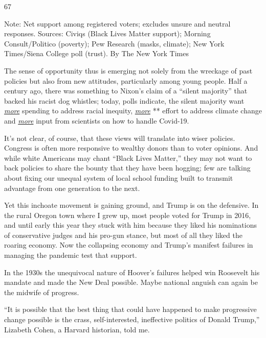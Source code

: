 67

Note: Net support among registered voters; excludes unsure and neutral
responses. Sources: Civiqs (Black Lives Matter support); Morning
Consult/Politico (poverty); Pew Research (masks, climate); New York
Times/Siena College poll (trust). \textbar{} By The New York Times

The sense of opportunity thus is emerging not solely from the wreckage
of past policies but also from new attitudes, particularly among young
people. Half a century ago, there was something to Nixon's claim of a
``silent majority'' that backed his racist dog whistles; today, polls
indicate, the silent majority want
\href{https://gssdataexplorer.norc.org/projects/82650/variables/188/vshow}{\emph{more}}
spending to address racial inequity,
\href{https://www.pewresearch.org/fact-tank/2020/04/21/how-americans-see-climate-change-and-the-environment-in-7-charts/}{\emph{more}}
** effort to address climate change and
\href{https://www.nytimes3xbfgragh.onion/2020/06/27/upshot/coronavirus-americans-trust-experts.html}{\emph{more}}
input from scientists on how to handle Covid-19.

It's not clear, of course, that these views will translate into wiser
policies. Congress is often more responsive to wealthy donors than to
voter opinions. And while white Americans may chant ``Black Lives
Matter,'' they may not want to back policies to share the bounty that
they have been hogging; few are talking about fixing our unequal system
of local school funding built to transmit advantage from one generation
to the next.

Yet this inchoate movement is gaining ground, and Trump is on the
defensive. In the rural Oregon town where I grew up, most people voted
for Trump in 2016, and until early this year they stuck with him because
they liked his nominations of conservative judges and his pro-gun
stance, but most of all they liked the roaring economy. Now the
collapsing economy and Trump's manifest failures in managing the
pandemic test that support.

In the 1930s the unequivocal nature of Hoover's failures helped win
Roosevelt his mandate and made the New Deal possible. Maybe national
anguish can again be the midwife of progress.

``It is possible that the best thing that could have happened to make
progressive change possible is the crass, self-interested, ineffective
politics of Donald Trump,'' Lizabeth Cohen, a Harvard historian, told
me.

